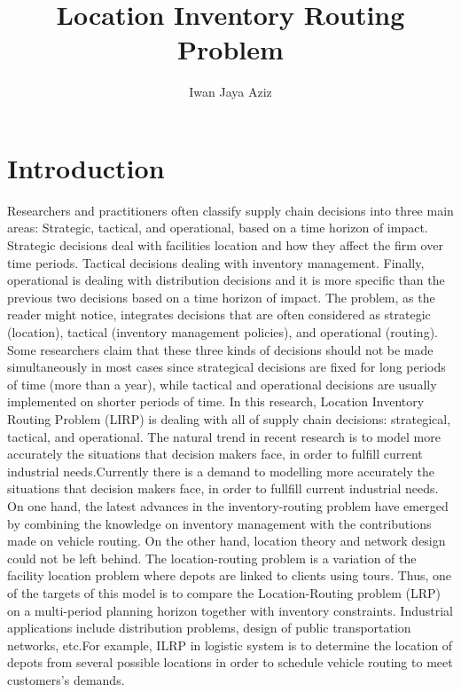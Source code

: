\documentclass[12pt, a4paper]{article}
\title{Location Inventory Routing Problem}
\author{Iwan Jaya Aziz}
\begin{document}
\maketitle

\section{Introduction}
Researchers and practitioners often classify supply chain decisions into three main areas: Strategic, tactical, and operational, based on a time horizon of impact. Strategic decisions deal with facilities location and how they affect the firm over time periods. Tactical decisions dealing with inventory management. Finally, operational is dealing with distribution decisions and it is more specific than the previous two decisions based on a time horizon of impact. The problem, as the reader might notice, integrates decisions that are often considered as strategic (location), tactical (inventory management policies), and operational (routing). Some researchers claim that these three kinds of decisions should not be made simultaneously in most cases since strategical decisions are fixed for long periods of time (more than a year), while tactical and operational decisions are usually implemented on shorter periods of time. In this research, Location Inventory Routing Problem (LIRP) is dealing with all of supply chain decisions: strategical, tactical, and operational. The natural trend in recent research is to model more accurately the situations that decision makers face, in order to fulfill current industrial needs.Currently there is a demand to modelling more accurately the situations that decision makers face, in order to fullfill current industrial needs. On one hand, the latest advances in the inventory-routing problem have emerged by combining the knowledge on inventory management with the contributions made on vehicle routing. On the other hand, location theory and network design could not be left behind. The location-routing problem is a variation of the facility location problem where depots are linked to clients using tours. Thus, one of the targets of this model is to compare the Location-Routing problem (LRP) on a multi-period planning horizon together with inventory constraints. Industrial applications include distribution problems, design of public transportation networks, etc.For example, ILRP in logistic system is to determine the location of depots from several possible locations in order to schedule vehicle routing to meet customers's demands.
\end{document}
